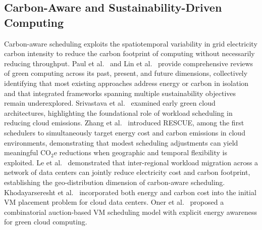 \documentclass[a4paper,fleqn]{cas-dc}
\begin{document}
\subsection{Carbon-Aware and Sustainability-Driven Computing}

Carbon-aware scheduling exploits the spatiotemporal variability in grid electricity carbon intensity to reduce the carbon footprint of computing without necessarily reducing throughput. Paul et al.~\cite{ref-paul23review} and Lin et al.~\cite{ref-lin24review} provide comprehensive reviews of green computing across its past, present, and future dimensions, collectively identifying that most existing approaches address energy or carbon in isolation and that integrated frameworks spanning multiple sustainability objectives remain underexplored. Srivastava et al.~\cite{ref-srivastava20} examined early green cloud architectures, highlighting the foundational role of workload scheduling in reducing cloud emissions. Zhang et al.~\cite{ref-zhang14} introduced RESCUE, among the first schedulers to simultaneously target energy cost and carbon emissions in cloud environments, demonstrating that modest scheduling adjustments can yield meaningful CO$_{2}$e reductions when geographic and temporal flexibility is exploited. Le et al.~\cite{ref-le15} demonstrated that inter-regional workload migration across a network of data centers can jointly reduce electricity cost and carbon footprint, establishing the geo-distribution dimension of carbon-aware scheduling. Khodayarseresht et al.~\cite{ref-khodayarseresht23} incorporated both energy and carbon cost into the initial VM placement problem for cloud data centers. Oner et al.~\cite{ref-oner23} proposed a combinatorial auction-based VM scheduling model with explicit energy awareness for green cloud computing.
\end{document}
